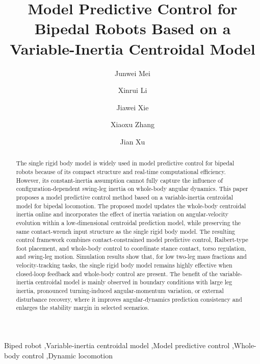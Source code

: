 \documentclass[5p,times]{elsarticle}
\begin{document}
\begin{frontmatter}

\title{Model Predictive Control for Bipedal Robots Based on a Variable-Inertia Centroidal Model}

\author[label1]{Junwei Mei}
\author[label1]{Xinrui Li}
\author[label1]{Jiawei Xie}
\author[label1,label2,label3]{Xiaoxu Zhang}
\author[label1,label2,label3]{Jian Xu}
\address[label1]{College of Intelligent Robotics and Advanced Manufacturing, Fudan University, Shanghai 200433, China}
\address[label2]{MOE Frontiers Center for Brain Science, Fudan University, Shanghai 200433, China}
\address[label3]{Yiwu Research Institute, Fudan University, Yiwu 322000, China}

\begin{abstract}
The single rigid body model is widely used in model predictive control for bipedal robots because of its compact structure and real-time computational efficiency. However, its constant-inertia assumption cannot fully capture the influence of configuration-dependent swing-leg inertia on whole-body angular dynamics. This paper proposes a model predictive control method based on a variable-inertia centroidal model for bipedal locomotion. The proposed model updates the whole-body centroidal inertia online and incorporates the effect of inertia variation on angular-velocity evolution within a low-dimensional centroidal prediction model, while preserving the same contact-wrench input structure as the single rigid body model. The resulting control framework combines contact-constrained model predictive control, Raibert-type foot placement, and whole-body control to coordinate stance contact, torso regulation, and swing-leg motion. Simulation results show that, for low two-leg mass fractions and velocity-tracking tasks, the single rigid body model remains highly effective when closed-loop feedback and whole-body control are present. The benefit of the variable-inertia centroidal model is mainly observed in boundary conditions with large leg inertia, pronounced turning-induced angular-momentum variation, or external disturbance recovery, where it improves angular-dynamics prediction consistency and enlarges the stability margin in selected scenarios.
\end{abstract}

\begin{keyword}
Biped robot \sep Variable-inertia centroidal model \sep Model predictive control \sep Whole-body control \sep Dynamic locomotion
\end{keyword}

\end{frontmatter}
\end{document}

